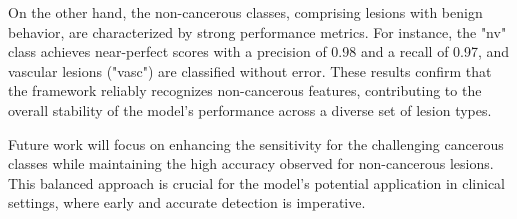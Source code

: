 On the other hand, the non-cancerous classes, comprising lesions with benign behavior, are characterized by strong performance metrics. For instance, the "nv" class achieves near-perfect scores with a precision of 0.98 and a recall of 0.97, and vascular lesions ("vasc") are classified without error. These results confirm that the framework reliably recognizes non-cancerous features, contributing to the overall stability of the model's performance across a diverse set of lesion types.

Future work will focus on enhancing the sensitivity for the challenging cancerous classes while maintaining the high accuracy observed for non-cancerous lesions. This balanced approach is crucial for the model's potential application in clinical settings, where early and accurate detection is imperative.

